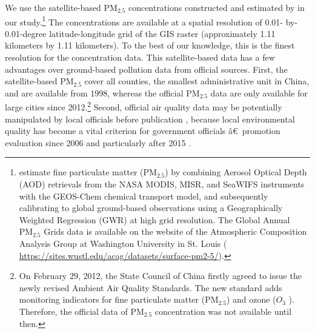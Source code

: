\documentclass[12pt]{article}
\begin{document}
We use the satellite-based $\mathrm{PM_{2.5}}$ concentrations constructed
and estimated by \cite{van2021monthly} in our study.\footnote{\cite%
{van2021monthly} estimate fine particulate matter ($\mathrm{PM_{2.5}}$) by
combining Aerosol Optical Depth (AOD) retrievals from the NASA MODIS, MISR,
and SeaWIFS instruments with the GEOS-Chem chemical transport model, and
subsequently calibrating to global ground-based observations using a
Geographically Weighted Regression (GWR) at high grid resolution. The Global
Annual $\mathrm{PM_{2.5}}$ Grids data is available on the website of the
Atmospheric Composition Analysis Group at Washington University in St. Louis
( \url{https://sites.wustl.edu/acag/datasets/surface-pm2-5/}).}  The
concentrations are available at a spatial resolution of 0.01- by-0.01-degree
latitude-longitude grid of the GIS raster (approximately 1.11 kilometers by
1.11 kilometers). To the best of our knowledge, this is the finest
resolution for the concentration data. This satellite-based data has a few
advantages over ground-based pollution data from official sources. First,
the satellite-based $\mathrm{PM_{2.5}}$ cover all counties, the smallest
administrative unit in China, and are available from 1998, whereas the
official $\mathrm{PM_{2.5}}$ data are only available for large cities since
2012.\footnote{%
On February 29, 2012, the State Council of China firstly agreed to issue the
newly revised Ambient Air Quality Standards. The new standard adds
monitoring indicators for fine particulate matter ($\mathrm{PM_{2.5}}$) and
ozone ($O_{3}$ ). Therefore, the official data of $\mathrm{PM_{2.5}}$
concentration was not available until then.} Second, official air quality
data may be potentially manipulated by local officials before publication %
\citep{ghanem2014effortless,andrews2008inconsistencies}, because local
environmental quality has become a vital criterion for government officials%
\^{a}\euro \texttrademark\ promotion evaluation since 2006 and particularly
after 2015 \citep{Fan2022}.
\end{document}
